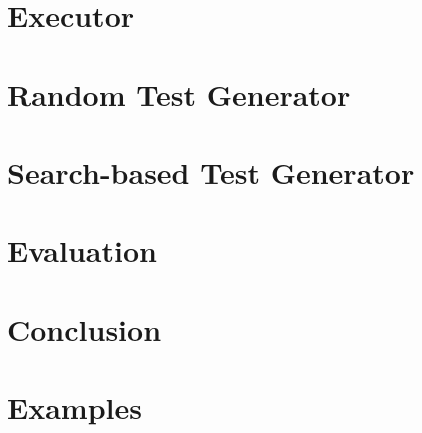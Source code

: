 \chapter{Executor}
\chapter{Random Test Generator}
\chapter{Search-based Test Generator}
\chapter{Evaluation}
\chapter{Conclusion}

\appendix
\chapter{Examples}